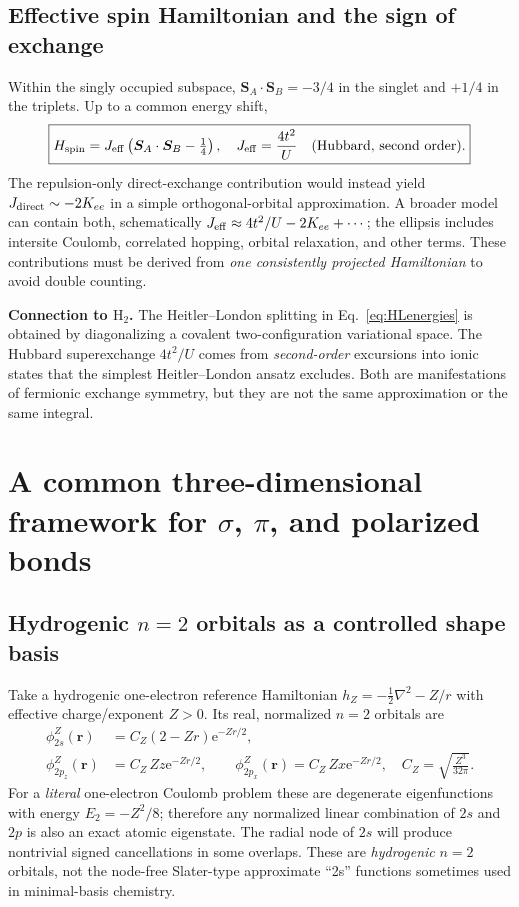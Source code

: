\documentclass[11pt,letterpaper]{article}
\newcommand{\e}{\mathrm e}
\newcommand{\highlight}[1]{\par\smallskip\noindent\colorbox{pale}{\parbox{0.956\linewidth}{\strut #1\strut}}\smallskip\par}
\begin{document}
\subsection{Effective spin Hamiltonian and the sign of exchange}
Within the singly occupied subspace, $\bm S_A\cdot\bm S_B=-3/4$ in the singlet and $+1/4$ in the triplets. Up to a common energy shift,
\begin{equation}\label{eq:heisenberg}
\boxed{H_{\rm spin}=J_{\rm eff}\left(\bm S_A\cdot\bm S_B-\tfrac14\right),\quad J_{\rm eff}=\frac{4t^2}{U}\quad\text{(Hubbard, second order)}.}
\end{equation}
The repulsion-only direct-exchange contribution would instead yield $J_{\rm direct}\sim-2K_{ee}$ in a simple orthogonal-orbital approximation. A broader model can contain both, schematically $J_{\rm eff}\approx4t^2/U-2K_{ee}+\cdots$; the ellipsis includes intersite Coulomb, correlated hopping, orbital relaxation, and other terms. These contributions must be derived from \emph{one consistently projected Hamiltonian} to avoid double counting.

\highlight{\textbf{Connection to $\mathrm H_2$.} The Heitler--London splitting in Eq.~\eqref{eq:HLenergies} is obtained by diagonalizing a covalent two-configuration variational space. The Hubbard superexchange $4t^2/U$ comes from \emph{second-order} excursions into ionic states that the simplest Heitler--London ansatz excludes. Both are manifestations of fermionic exchange symmetry, but they are not the same approximation or the same integral.}
\FloatBarrier

\section{A common three-dimensional framework for $\sigma$, $\pi$, and polarized bonds}
\subsection{Hydrogenic $n=2$ orbitals as a controlled shape basis}
Take a hydrogenic one-electron reference Hamiltonian $h_Z=-\frac12\nabla^2-Z/r$ with effective charge/exponent $Z>0$. Its real, normalized $n=2$ orbitals are
\begin{align}\label{eq:n2-orbitals}
\phi_{2s}^{Z}(\mathbf r)&=C_Z(2-Zr)\e^{-Zr/2},\\
\phi_{2p_z}^{Z}(\mathbf r)&=C_Z\,Zz\e^{-Zr/2},\qquad
\phi_{2p_x}^{Z}(\mathbf r)=C_Z\,Zx\e^{-Zr/2},\quad C_Z=\sqrt{\frac{Z^3}{32\pi}}.\nonumber
\end{align}
For a \emph{literal} one-electron Coulomb problem these are degenerate eigenfunctions with energy $E_2=-Z^2/8$; therefore any normalized linear combination of $2s$ and $2p$ is also an exact atomic eigenstate. The radial node of $2s$ will produce nontrivial signed cancellations in some overlaps. These are \emph{hydrogenic} $n=2$ orbitals, not the node-free Slater-type approximate ``2s'' functions sometimes used in minimal-basis chemistry.
\end{document}
